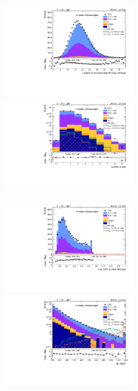 \begin{figure}[!htb]
  \begin{center}  
    \includegraphics[width=0.495\textwidth]{plots/v9_thesis/XVZnnlpSB/nPV.pdf}
    \includegraphics[width=0.495\textwidth]{plots/v9_thesis/XVZnnlpSB/nJets.pdf}

    \includegraphics[width=0.495\textwidth]{plots/v9_thesis/XVZnnlpSB/MaxJetBTag.pdf}
    \includegraphics[width=0.495\textwidth]{plots/v9_thesis/XVZnnlpSB/MEt_pt.pdf}


\end{center}
\end{figure}
